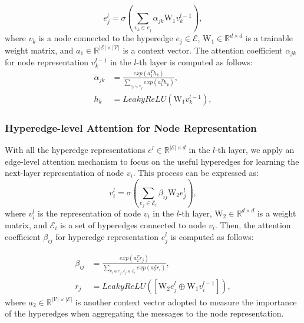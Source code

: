 \documentclass[conference]{IEEEtran}
\begin{document}
\begin{equation}
    e^{l}_{j} = \sigma \left(  \sum_{v_{k} \in e_{j}} \alpha_{jk} \mathrm{W_{1}} v^{l-1}_{k} \right),
\end{equation}
where $v_{k}$ is a node connected to the hyperedge $e_{j}\in\mathcal{E}$, $\mathrm{W_1} \in \mathbb{R}^{ \mathit{d} \times  \mathit{d}}$ is a trainable weight matrix, and $a_1 \in \mathbb{R}^{|\mathcal{E}| \times |\mathcal{V}|}$ is a context vector. The attention coefficient $\alpha_{jk}$ for node representation $v^{l-1}_k$ in the $\textit{l}$-th layer is computed as follows:
\begin{equation}
\begin{aligned}
    \alpha_{jk} &= \frac{exp \left( a^{T}_{1} h_{k} \right)}{\sum_{v_{p} \in e_{j}} exp \left( a^{T}_{1} h_{p}\right)},\\
    h_{k} &= LeakyReLU \left(  \mathrm{W_{1}} v^{l-1}_{k}  \right),
\end{aligned}
\end{equation}


\subsubsection{Hyperedge-level Attention for Node Representation}
With all the hyperedge representations $e^{l} \in \mathbb{R}^{|\mathcal{E}|\times{ \mathit{d}}}$ in the $\mathit{l}$-th layer, we apply an edge-level attention mechanism to focus on the useful hyperedges for learning the next-layer representation of node $v_{i}$. This process can be expressed as:
\begin{equation}
    v^{l}_{i} = \sigma \left(  \sum_{e_{j} \in \mathcal{E}_{i}} \beta_{ij} \mathrm{W_{2}} e^{l}_{j} \right),
\end{equation}
where $v^{l}_{i}$ is the representation of node $v_{i}$ in the $\mathit{l}$-th layer, $\mathrm{W_2} \in \mathbb{R}^{\mathit{d} \times \mathit{d}}$ is a weight matrix, and $\mathcal{E}_i$ is a set of hyperedges connected to node $v_i$. Then, the attention coefficient $\beta_{ij}$ for hyperedge representation $e^{l}_{j}$ is computed as follows:

\begin{equation}
\begin{aligned}
    \beta_{ij} &= \frac{exp \left( a^{T}_{2} r_{j} \right)}{\sum_{v_{i} \in e_{j}, e_{j}  \in \mathcal{E}_i} exp \left( a^{T}_{2} r_{i}\right)},\\
    r_{j} &= LeakyReLU \left( [ \mathrm{W_{2}} e^{l}_{j} \oplus  \mathrm{W_{1}} v^{l-1}_{i}  ] \right),
\end{aligned}
\end{equation}
where $a_{2} \in \mathbb{R}^{|\mathcal{V}| \times |\mathcal{E}|}$ is another context vector adopted to measure the importance of the hyperedges when aggregating the messages to the node representation. 
\end{document}
